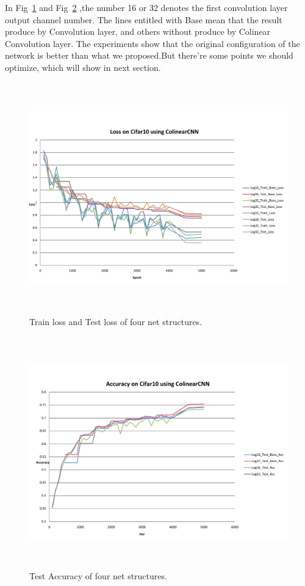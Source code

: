 \documentclass[12pt]{article}
\begin{document}
In Fig~\ref{fig:loss} and Fig~\ref{fig:acc} ,the number 16 or 32 denotes the first convolution layer output channel number. The lines entitled with Base mean that the result produce by Convolution layer, and others without produce by Colinear Convolution layer. The experiments show that the original configuration of the network is better than what we proposed.But there're some points we should optimize, which will show in next section.
\begin{figure}[!ht]
    \centering
    \includegraphics[height=10cm]{1.pdf}
    \caption{\label{fig:loss} Train loss and Test loss of four net structures.}
\end{figure}
\begin{figure}[!ht]
    \centering
    \includegraphics[height=10cm]{2.pdf}
    \caption{\label{fig:acc} Test Accuracy of four net structures.}
\end{figure}
\end{document}
